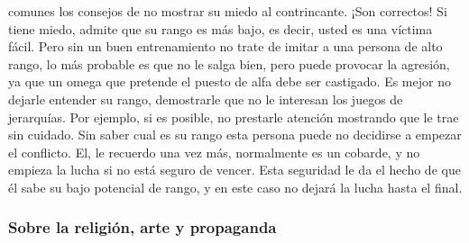comunes los consejos de no mostrar su miedo al contrincante. ¡Son
correctos! Si tiene miedo, admite que su rango es más bajo, es decir,
usted es una víctima fácil. Pero sin un buen entrenamiento no trate de
imitar a una persona de alto rango, lo más probable es que no le salga
bien, pero puede provocar la agresión, ya que un omega que pretende el
puesto de alfa debe ser castigado. Es mejor no dejarle entender su
rango, demostrarle que no le interesan los juegos de jerarquías. Por
ejemplo, si es posible, no prestarle atención mostrando que le trae sin
cuidado. Sin saber cual es su rango esta persona puede no decidirse a
empezar el conflicto. El, le recuerdo una vez más, normalmente es un
cobarde, y no empieza la lucha si no está seguro de vencer. Esta
seguridad le da el hecho de que él sabe su bajo potencial de rango, y en
este caso no dejará la lucha hasta el final.

\protect\hypertarget{M25}{}{}

\hypertarget{sobre-la-religiuxf3n-arte-y-propaganda}{\subsubsection{Sobre la religión, arte y propaganda}\label{sobre-la-religiuxf3n-arte-y-propaganda}}

